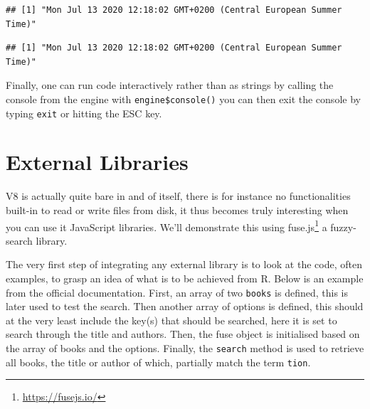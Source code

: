 \documentclass[
]{krantz}
\makeatletter
\newenvironment{Shaded}{\begin{snugshade}}{\end{snugshade}}
\newcommand{\CommentTok}[1]{\textcolor[rgb]{0.37,0.37,0.37}{\textit{#1}}}
\newcommand{\KeywordTok}[1]{\textcolor[rgb]{0.27,0.27,0.27}{\textbf{#1}}}
\newcommand{\NormalTok}[1]{#1}
\newcommand{\OperatorTok}[1]{\textcolor[rgb]{0.43,0.43,0.43}{\textbf{#1}}}
\newcommand{\StringTok}[1]{\textcolor[rgb]{0.5,0.5,0.5}{#1}}
\renewcommand{\href}[2]{#2\footnote{\url{#1}}}
\newenvironment{kframe}{%
\medskip{}
\setlength{\fboxsep}{.8em}
 \def\at@end@of@kframe{}%
 \ifinner\ifhmode%
  \def\at@end@of@kframe{\end{minipage}}%
  \begin{minipage}{\columnwidth}%
 \fi\fi%
 \def\FrameCommand##1{\hskip\@totalleftmargin \hskip-\fboxsep
 \colorbox{shadecolor}{##1}\hskip-\fboxsep
     \hskip-\linewidth \hskip-\@totalleftmargin \hskip\columnwidth}%
 \MakeFramed {\advance\hsize-\width
   \@totalleftmargin\z@ \linewidth\hsize
   \@setminipage}}%
 {\par\unskip\endMakeFramed%
 \at@end@of@kframe}
\renewenvironment{Shaded}{\begin{kframe}}{\end{kframe}}
\makeatother
\begin{document}
\begin{Shaded}
\end{Shaded}

\begin{verbatim}
## [1] "Mon Jul 13 2020 12:18:02 GMT+0200 (Central European Summer Time)"
\end{verbatim}

\begin{Shaded}
\end{Shaded}

\begin{verbatim}
## [1] "Mon Jul 13 2020 12:18:02 GMT+0200 (Central European Summer Time)"
\end{verbatim}

Finally, one can run code interactively rather than as strings by calling the console from the engine with \texttt{engine\$console()} you can then exit the console by typing \texttt{exit} or hitting the ESC key.

\hypertarget{external-libraries}{%
\section*{External Libraries}\label{external-libraries}}


V8 is actually quite bare in and of itself, there is for instance no functionalities built-in to read or write files from disk, it thus becomes truly interesting when you can use it JavaScript libraries. We'll demonstrate this using \href{https://fusejs.io/}{fuse.js} a fuzzy-search library.

The very first step of integrating any external library is to look at the code, often examples, to grasp an idea of what is to be achieved from R. Below is an example from the official documentation. First, an array of two \texttt{books} is defined, this is later used to test the search. Then another array of options is defined, this should at the very least include the key(s) that should be searched, here it is set to search through the title and authors. Then, the fuse object is initialised based on the array of books and the options. Finally, the \texttt{search} method is used to retrieve all books, the title or author of which, partially match the term \texttt{tion}.
\end{document}
